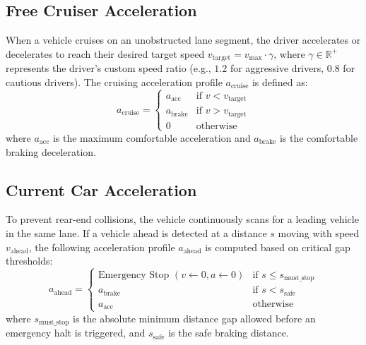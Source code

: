 \documentclass[../report_main.tex]{subfiles}
\begin{document}
\subsection{Free Cruiser Acceleration}
When a vehicle cruises on an unobstructed lane segment, the driver accelerates or decelerates to reach their desired target speed $v_{\text{target}} = v_{\text{max}} \cdot \gamma$, where $\gamma \in \mathbb{R}^+$ represents the driver's custom speed ratio (e.g., $1.2$ for aggressive drivers, $0.8$ for cautious drivers). The cruising acceleration profile $a_{\text{cruise}}$ is defined as:
\begin{equation}
    a_{\text{cruise}} = \begin{cases}
        a_{\text{acc}} & \text{if } v < v_{\text{target}} \\
        a_{\text{brake}} & \text{if } v > v_{\text{target}} \\
        0 & \text{otherwise}
    \end{cases}
\end{equation}
where $a_{\text{acc}}$ is the maximum comfortable acceleration and $a_{\text{brake}}$ is the comfortable braking deceleration.

\subsection{Current Car Acceleration}
To prevent rear-end collisions, the vehicle continuously scans for a leading vehicle in the same lane. If a vehicle ahead is detected at a distance $s$ moving with speed $v_{\text{ahead}}$, the following acceleration profile $a_{\text{ahead}}$ is computed based on critical gap thresholds:
\begin{equation}
    a_{\text{ahead}} = \begin{cases}
        \text{Emergency Stop } (v \leftarrow 0, a \leftarrow 0) & \text{if } s \leq s_{\text{must\_stop}} \\
        a_{\text{brake}} & \text{if } s < s_{\text{safe}} \\
        a_{\text{acc}} & \text{otherwise}
    \end{cases}
\end{equation}
where $s_{\text{must\_stop}}$ is the absolute minimum distance gap allowed before an emergency halt is triggered, and $s_{\text{safe}}$ is the safe braking distance.
\end{document}
